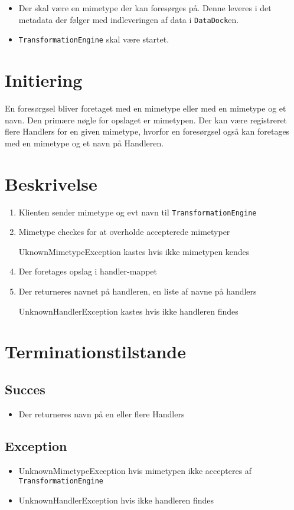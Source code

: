 \documentclass{article}
\begin{document}
\begin{itemize}
\item Der skal være en mimetype der kan foresørges på. Denne leveres i det metadata der følger med indleveringen af data i \texttt{DataDock}en.
\item \texttt{TransformationEngine} skal være startet.
\end{itemize}

\section{Initiering}
En foresørgsel bliver foretaget med en mimetype eller med en mimetype og et navn. Den primære nøgle for opslaget er mimetypen. Der kan være registreret flere Handlers for en given mimetype, hvorfor en foresørgsel også kan foretages med en mimetype og et navn på Handleren.

\section{Beskrivelse}

\begin{enumerate}
\item Klienten sender mimetype og evt navn til \texttt{TransformationEngine}
\item Mimetype checkes for at overholde accepterede mimetyper
\item [UknownMimetypeException] kastes hvis ikke mimetypen kendes
\item Der foretages opslag i handler-mappet
\item Der returneres navnet på handleren, en liste af navne på handlers
\item [UnknownHandlerException] kastes hvis ikke handleren findes
\end{enumerate}

\section{Terminationstilstande}

\subsection{Succes}
\begin{itemize}
\item Der returneres navn på en eller flere Handlers
\end{itemize}

\subsection{Exception}
\begin{itemize}
\item UnknownMimetypeException hvis mimetypen ikke accepteres af \texttt{TransformationEngine}
\item UnknownHandlerException hvis ikke handleren findes
\end{itemize}
\end{document}
